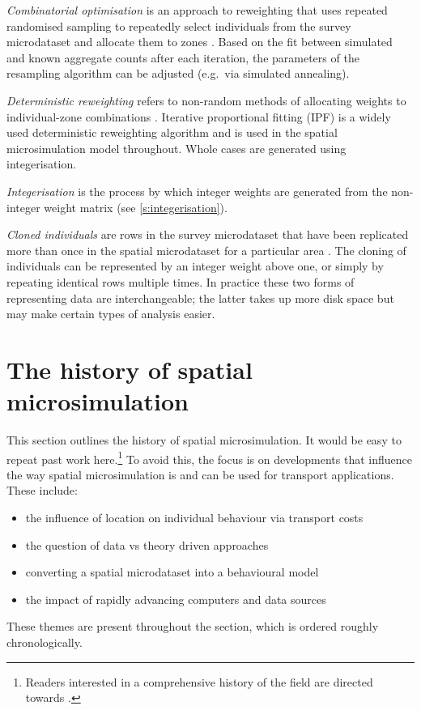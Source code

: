 \emph{Combinatorial optimisation}  is an
approach to reweighting that uses repeated randomised sampling to
repeatedly select individuals from the survey microdataset and allocate them to
zones \citep{Williamson1998, Voas2000}. Based on the fit between simulated
and known aggregate counts after each
iteration, the parameters of the resampling algorithm can be adjusted (e.g.~via
simulated annealing).

\emph{Deterministic reweighting} refers to non-random methods of allocating
weights to individual-zone combinations \citep{Ballas2007simb, Tomintz2008}.
Iterative proportional fitting (IPF)
is a widely used deterministic reweighting algorithm and is used in the
spatial microsimulation model throughout. Whole cases
are generated using integerisation.

\emph{Integerisation} is the process by which integer weights are generated
from the non-integer weight matrix (see \cref{s:integerisation}).

\emph{Cloned individuals}  are rows in the survey microdataset
that have been replicated more than once in the spatial microdataset for a
particular area \citep{Smith2009}.
The cloning of individuals can be represented by an integer
weight above one, or simply by repeating identical rows multiple times. In
practice these two forms of representing data are interchangeable; the latter
takes up more disk space \citep{Holm1996} but may make certain types of analysis
easier.


\section{The history of spatial microsimulation}
\label{s:history}
This section outlines the history of spatial microsimulation. It would
be easy to repeat past work here.\footnote{Readers interested in a
comprehensive history of the field are directed towards
\citet{Ballas2009-sage}.} To avoid this, the focus is on
developments that influence the way spatial microsimulation
is and can be used for transport applications. These include:
\begin{itemize}
 \item the influence of location on individual behaviour via
 transport costs 
 \item the question of data vs theory driven approaches
 \item converting a spatial microdataset into a behavioural model
 \item the impact of rapidly advancing computers and data sources
\end{itemize}
These themes are present throughout the section, which is ordered
roughly chronologically.

